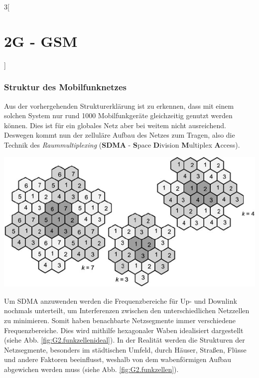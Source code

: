 \begin{multicols}{3}[\section{2G - GSM}]
\subsubsection*{Struktur des Mobilfunknetzes}
Aus der vorhergehenden Strukturerklärung ist zu erkennen, dass mit einem solchen System nur rund 1000 Mobilfunkgeräte gleichzeitig genutzt werden können. Dies ist für ein globales Netz aber bei weitem nicht ausreichend. Deswegen kommt nun der zelluläre Aufbau des Netzes zum Tragen, also die Technik des \textit{Raummultiplexing} (\textbf{SDMA} - \textbf{S}pace \textbf{D}ivision \textbf{M}ultiplex \textbf{A}ccess).\cite{G2.2}
\begin{Figure}
\includegraphics[width=\linewidth]{Kapitel/2G/Grafiken/GSM-Funkzellenideal.png}
\label{fig:G2.funkzellenideal}
\end{Figure}
Um SDMA anzuwenden werden die Frequenzbereiche für Up- und Downlink nochmals unterteilt, um Interferenzen zwischen den unterschiedlichen Netzzellen zu minimieren. Somit haben benachbarte Netzsegmente immer verschiedene Frequenzbereiche. Dies wird mithilfe hexagonaler Waben idealisiert dargestellt (siehe Abb. \ref{fig:G2.funkzellenideal}). In der Realität werden die Strukturen der Netzsegmente, besonders im städtischen Umfeld, durch Häuser, Straßen, Flüsse und andere Faktoren beeinflusst, weshalb von dem wabenförmigen Aufbau abgewichen werden muss (siehe Abb. \ref{fig:G2.funkzellen}).
\begin{Figure}

\end{Figure}
\end{multicols}
